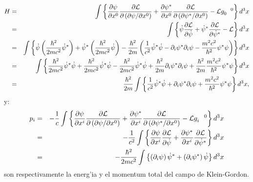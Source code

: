 \begin{eqnarray}
H &=&\int \left\{ \frac{\partial \psi }{\partial x^{0}}\frac{\partial 
{\cal L}}{\partial \left( \partial \psi /\partial x^{0}\right) }+\frac{%
\partial \psi ^{\ast }}{\partial x^{0}}\frac{\partial {\cal L}}{\partial
\left( \partial \psi ^{\ast }/\partial x^{0}\right) }-{\cal L}g_{0}^{\quad
0}\right\} d^{3}x  \notag \\
&=&\int \left\{ \dot{\psi}\frac{\partial {\cal L}}{\partial \dot{\psi}}+\dot{%
\psi}^{\ast }\frac{\partial {\cal L}}{\partial \dot{\psi}^{\ast }}-{\cal L}%
\right\} d^{3}x  \notag \\
&=&\int \left\{ \dot{\psi}\left( \frac{\hbar ^{2}}{2mc^{2}}\dot{\psi}^{\ast
}\right) +\dot{\psi}^{\ast }\left( \frac{\hbar ^{2}}{2mc^{2}}\dot{\psi}%
\right) -\frac{\hbar ^{2}}{2m}\left( \frac{1}{c^{2}}\dot{\psi}^{\ast }\dot{%
\psi}-\partial _{i}\psi ^{\ast }\partial _{i}\psi -\frac{m^{2}c^{2}}{\hbar
^{2}}\psi ^{\ast }\psi \right) \right\} d^{3}x  \notag \\
&=&\int \left\{ \frac{\hbar ^{2}}{2mc^{2}}\dot{\psi}^{\ast }\dot{\psi}+\frac{%
\hbar ^{2}}{2mc^{2}}\dot{\psi}^{\ast }\dot{\psi}-\frac{\hbar ^{2}}{2mc^{2}}%
\dot{\psi}^{\ast }\dot{\psi}+\frac{\hbar ^{2}}{2m}\partial _{i}\psi ^{\ast
}\partial _{i}\psi +\frac{\hbar ^{2}}{2m}\frac{m^{2}c^{2}}{\hbar ^{2}}\psi
^{\ast }\psi \right\} d^{3}x  \notag \\
&=&\frac{\hbar ^{2}}{2m}\int \left\{ \frac{1}{c^{2}}\dot{\psi}^{\ast }\dot{%
\psi}+\partial _{i}\psi ^{\ast }\partial _{i}\psi +\frac{m^{2}c^{2}}{\hbar
^{2}}\psi ^{\ast }\psi \right\} d^{3}x,  \label{Energia Total Campo K-G}
\end{eqnarray}%
y:%
\begin{eqnarray}
p_{i} &=&-\frac{1}{c}\int \left\{ \frac{\partial \psi }{\partial x^{i}}\frac{%
\partial {\cal L}}{\partial \left( \partial \psi /\partial x^{0}\right) }+%
\frac{\partial \psi ^{\ast }}{\partial x^{i}}\frac{\partial {\cal L}}{%
\partial \left( \partial \psi ^{\ast }/\partial x^{0}\right) }-{\cal L}%
g_{i}^{\quad 0}\right\} d^{3}x  \notag \\
&=&-\frac{1}{c^{2}}\int \left\{ \frac{\partial \psi }{\partial x^{i}}\frac{%
\partial {\cal L}}{\partial \dot{\psi}}+\frac{\partial \psi ^{\ast }}{%
\partial x^{i}}\frac{\partial {\cal L}}{\partial \dot{\psi}^{\ast }}\right\}
d^{3}x  \notag \\
&=&-\frac{\hbar ^{2}}{2mc^{2}}\int \left\{ \left( \partial _{i}\psi \right)
\dot{\psi}^{\ast }+\left( \partial _{i}\psi ^{\ast }\right) \dot{\psi}%
\right\} d^{3}x  \label{Momentum Total Campo K-G}
\end{eqnarray}%
son respectivamente la energ'ia y el momentum total del campo de
Klein-Gordon.

